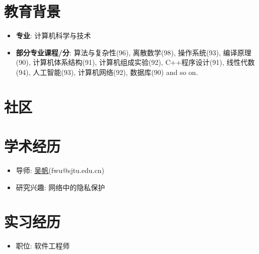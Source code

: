 \documentclass[11pt,a4paper]{moderncv}
\title{}               %
\begin{document}
\maketitle

\section{教育背景}
{
\begin{itemize}
\item \textbf{专业}: 计算机科学与技术
\item \textbf{部分专业课程/分}: 算法与复杂性(96), 离散数学(98), 操作系统(93), 编译原理(90), 计算机体系结构(91), 计算机组成实验(92), C++程序设计(91), 线性代数(94), 人工智能(93), 计算机网络(92), 数据库(90) and so on.\\
\end{itemize}
}




\section{社区}

\section{学术经历}
{
\begin{itemize}
\item 导师: \href{http://www.cs.sjtu.edu.cn/~fwu/index.html}{吴帆}(fwu@sjtu.edu.cn)
\item 研究兴趣: 网络中的隐私保护
\end{itemize}
}

\section{实习经历}
{
\begin{itemize}
\item 职位: 软件工程师
\end{itemize}
}
\end{document}
